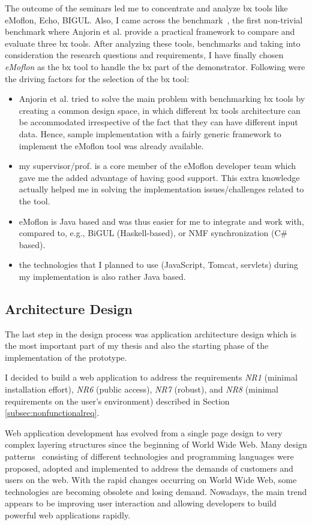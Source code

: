 The outcome of the seminars led me to concentrate and analyze bx tools like eMoflon, Echo, BIGUL. Also, I came across the benchmark~\cite{benchmarx}\cite{benchmarx-reload}, the first non-trivial benchmark where Anjorin et al. provide a practical framework to compare and evaluate three bx tools. After analyzing these tools, benchmarks and taking into consideration the research questions and requirements, I have finally chosen \textit{eMoflon} as the bx tool to handle the bx part of the demonstrator. Following were the driving factors for the selection of the bx tool:
\begin{itemize}
	\item {Anjorin et al. \cite{benchmarx-reload} tried to solve the main problem with benchmarking bx tools by creating a common design space, in which different bx tools architecture can be accommodated irrespective of the fact that they can have different input data. Hence, sample implementation with a fairly generic framework to implement the eMoflon tool was already available.}
	\item {my supervisor/prof. is a core member of the eMoflon developer team which gave me the added advantage of having good support. This extra knowledge actually helped me in solving the implementation issues/challenges related to the tool.}
	\item {eMoflon is Java based and was thus easier for me to integrate and work with, compared to, e.g., BiGUL (Haskell-based), or NMF synchronization (C\# based).}
	\item {the technologies that I planned to use (JavaScript, Tomcat, servlets) during my implementation is also rather Java based.}
\end{itemize}

\subsection{Architecture Design}\label{subsec:architecturedesign}
The last step in the design process was application architecture design which is the most important part of my thesis and also the starting phase of the implementation of the prototype.

I decided to build a web application to address the requirements \textit{NR1} (minimal installation effort), \textit{NR6} (public access), \textit{NR7} (robust), and \textit{NR8} (minimal requirements on the user's environment) described in Section \ref{subsec:nonfunctionalreq}.

Web application development has evolved from a single page design to very complex layering structures since the beginning of World Wide Web. Many design patterns~\cite{designpattern}\cite{designpattern-notes} consisting of different technologies and programming languages were proposed, adopted and implemented to address the demands of customers and users on the web. With the rapid changes occurring on World Wide Web, some technologies are becoming obsolete and losing demand. Nowadays, the main trend appears to be improving user interaction and allowing developers to build powerful web applications rapidly.


